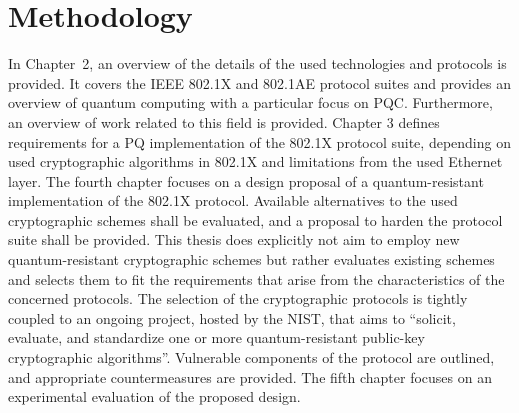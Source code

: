 \section{Methodology}
In Chapter~2, an overview of the details of the used technologies and protocols is provided. It covers the \ac{IEEE} 802.1X and 802.1AE protocol suites and provides an overview of quantum computing with a particular focus on \ac{PQC}. Furthermore, an overview of work related to this field is provided. Chapter 3 defines requirements for a PQ implementation of the 802.1X protocol suite, depending on used cryptographic algorithms in 802.1X and limitations from the used Ethernet layer. The fourth chapter focuses on a design proposal of a quantum-resistant implementation of the 802.1X protocol. Available alternatives to the used cryptographic schemes shall be evaluated, and a proposal to harden the protocol suite shall be provided. This thesis does explicitly not aim to employ new quantum-resistant cryptographic schemes but rather evaluates existing schemes and selects them to fit the requirements that arise from the characteristics of the concerned protocols. The selection of the cryptographic protocols is tightly coupled to an ongoing project, hosted by the \ac{NIST}, that aims to ``solicit, evaluate, and standardize one or more quantum-resistant public-key cryptographic algorithms''. Vulnerable components of the protocol are outlined, and appropriate countermeasures are provided. The fifth chapter focuses on an experimental evaluation of the proposed design.

\endinput